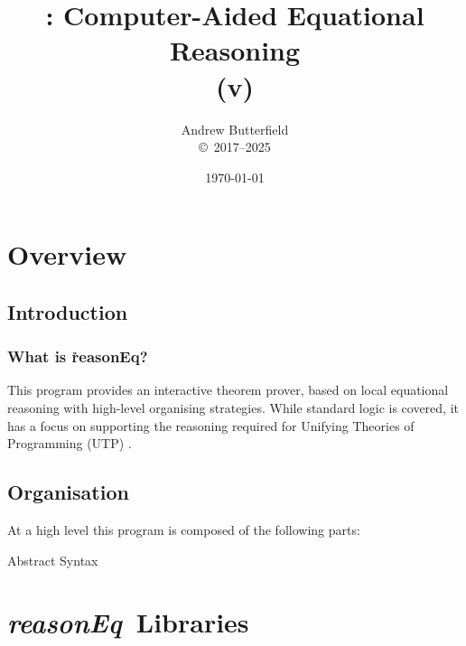 \documentclass[fleqn,10pt]{report}
\author{
Andrew Butterfield
\\
{\small \copyright\ 2017--2025}
}
\title{
  \reasonEq: Computer-Aided Equational Reasoning
  \\(v\reqVersion)
}
\date{
\today
}
\def\reasonEq{\textit{\textsf{reasonEq}}}
\begin{document}
\maketitle
\setcounter{tocdepth}{1}
\tableofcontents

\part{Overview}

\chapter{Introduction}

\section{What is \h{reasonEq}?}

This program provides an interactive theorem prover,
based on local equational reasoning with high-level organising strategies.
While standard logic is covered, 
it has a focus on supporting the reasoning required for
Unifying Theories of Programming (UTP) \cite{UTP-book}.

\chapter{Organisation}

At a high level this program is composed of the following parts:
\begin{description}
  \item[Abstract Syntax] 
\end{description}

% 

% 

\part{\reasonEq\ Libraries}


\end{document}
